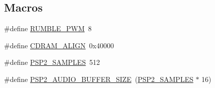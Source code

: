 \subsection*{Macros}
\begin{DoxyCompactItemize}
\item 
\#define \mbox{\hyperlink{psp2-context_8c_a78991a7c3d24f2e9931a9a40efe5e878}{R\+U\+M\+B\+L\+E\+\_\+\+P\+WM}}~8
\item 
\#define \mbox{\hyperlink{psp2-context_8c_af8036da621bc91932e6148bc6bf50643}{C\+D\+R\+A\+M\+\_\+\+A\+L\+I\+GN}}~0x40000
\item 
\#define \mbox{\hyperlink{psp2-context_8c_a2836712c7e6282747c6110a5f8a1d0cc}{P\+S\+P2\+\_\+\+S\+A\+M\+P\+L\+ES}}~512
\item 
\#define \mbox{\hyperlink{psp2-context_8c_ab405653a8fb99788f2f7cf61536fef78}{P\+S\+P2\+\_\+\+A\+U\+D\+I\+O\+\_\+\+B\+U\+F\+F\+E\+R\+\_\+\+S\+I\+ZE}}~(\mbox{\hyperlink{psp2-context_8c_a2836712c7e6282747c6110a5f8a1d0cc}{P\+S\+P2\+\_\+\+S\+A\+M\+P\+L\+ES}} $\ast$ 16)
\end{DoxyCompactItemize}
